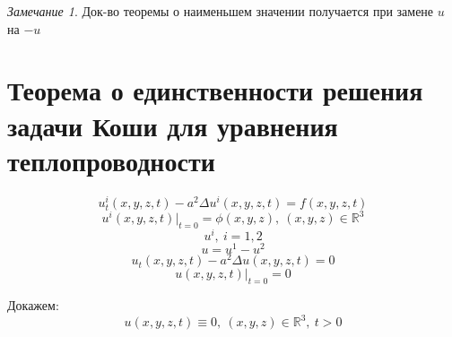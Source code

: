 \documentclass[a4paper]{article}
\theoremstyle{definition}
\theoremstyle{remark}
\newtheorem*{remark}{Замечание}
\begin{document}
\begin{tcolorbox}
\begin{remark}
    Док-во теоремы о наименьшем значении получается при замене $ u $ на $ -u $ 
\end{remark}
\end{tcolorbox}

\section*{Теорема о единственности решения задачи Коши для уравнения теплопроводности}
\begin{equation}
    u^{i}_t(x,y,z,t) - a^2 \Delta u^{i}(x,y,z,t) = f(x,y,z,t)
\end{equation}
\begin{equation}
    u^{i}(x,y,z,t) |_{t=0} = \phi (x,y,z), \ (x,y,z) \in \mathbb{R}^3
\end{equation}
\[
    u^{i}, \ i = 1, 2
\]
\[
    u = u^{1} - u^2
\]
\begin{equation}
    u_t(x,y,z,t) - a^2 \Delta u(x,y,z,t) = 0
\end{equation}
\begin{equation}
    u(x,y,z,t) |_{t=0} = 0
\end{equation}

Докажем:
\[
    u(x,y,z,t) \equiv 0, \ (x,y,z) \in \mathbb{R}^3, \ t > 0
\]
\end{document}
